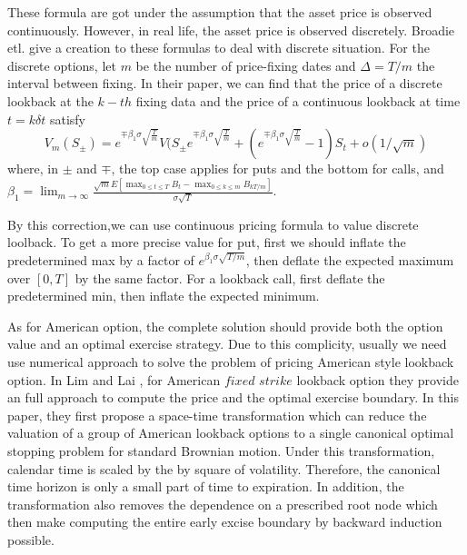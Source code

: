 \documentclass[11pt]{book}
\begin{document}
These formula are got under the assumption that the asset price is observed continuously. However, in real life, the asset price is observed discretely. Broadie etl. \cite{Broadie1999} give a creation to these formulas to deal with discrete situation. For the discrete options, let $m$ be the number of price-fixing dates and $\Delta = T/m$ the interval between fixing. In their paper, we can find that the price of a discrete lookback at the $k-th$ fixing data and the price of a continuous lookback at time $t = k \delta t$ satisfy
\begin{equation}\label{eq:7}
V_m (S_\pm) 
= 
e^{\mp\beta_1 \sigma \sqrt{\frac{T}{m}}} 
V(S_{\pm}e^{\mp\beta _1 \sigma \sqrt{\frac{T}{m}}} + 
(e^{\mp \beta_1 \sigma \sqrt{\frac{T}{m}}} -1)S_t + o(1/\sqrt{m})
\end{equation}
where, in $\pm$ and $\mp$, the top case applies for puts and the bottom for calls, and $\beta_1 = \lim_{m\to\infty} \frac{\sqrt{m}E[\max_{0\leq t \leq T} B_t - \max_{0\leq k \leq m} B_{kT/m}]}{\sigma \sqrt{T}}$. 

By this correction,we can use continuous pricing formula
to value discrete loolback. To get a more precise value for put,
first we should inflate the predetermined max by a factor of
$e^{\beta_1 \sigma \sqrt{T/m}}$,
then deflate the expected maximum over $[0,T]$ by the same factor. For a lookback call, first deflate the predetermined min, then inflate the expected minimum. 

As for American option, the complete solution should provide both the option value and an optimal exercise strategy. Due to this complicity, usually we need use numerical approach to solve the problem of pricing American style lookback option. In Lim and Lai \cite{Lim2004}, for American $fixed$ $strike$ lookback option they provide an full approach to compute the price and the optimal exercise boundary. In this paper, they first propose a space-time transformation which can reduce the valuation of a group of American lookback options to a single canonical optimal stopping problem for standard Brownian motion. Under this transformation, calendar time is scaled by the by square of volatility. Therefore, the canonical time horizon is only a small part of time to expiration. In addition, the transformation also removes the dependence on a prescribed root node which then make computing the entire early excise boundary by backward induction possible.  

\end{document}
